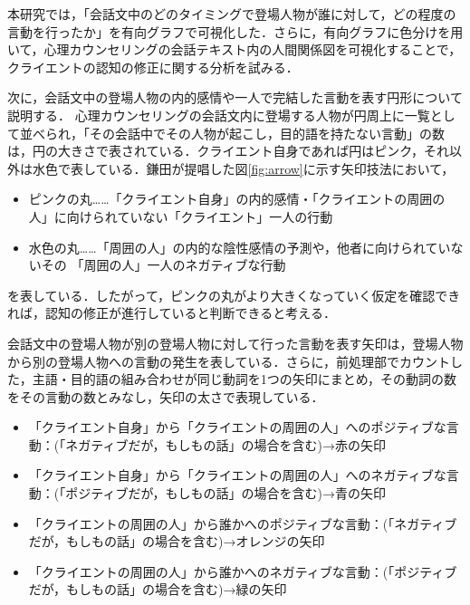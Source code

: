 \documentclass[shuuron]{kuee}
\begin{document}
本研究では，「会話文中のどのタイミングで登場人物が誰に対して，どの程度の言動を行ったか」を有向グラフで可視化した．さらに，有向グラフに色分けを用いて，心理カウンセリングの会話テキスト内の人間関係図を可視化することで，クライエントの認知の修正に関する分析を試みる．


次に，会話文中の登場人物の内的感情や一人で完結した言動を表す円形について説明する．
心理カウンセリングの会話文内に登場する人物が円周上に一覧として並べられ，「その会話中でその人物が起こし，目的語を持たない言動」の数は，円の大きさで表されている．クライエント自身であれば円はピンク，それ以外は水色で表している．鎌田\cite{鎌田穣2002臨床}が提唱した図\ref{fig:arrow}に示す矢印技法において，
\begin{itemize}
  \item ピンクの丸……「クライエント自身」の内的感情・「クライエントの周囲の人」に向けられていない「クライエント」一人の行動
  \item 水色の丸……「周囲の人」の内的な陰性感情の予測や，他者に向けられていないその
  「周囲の人」一人のネガティブな行動
\end{itemize}
を表している．したがって，ピンクの丸がより大きくなっていく仮定を確認できれば，認知の修正が進行していると判断できると考える．

会話文中の登場人物が別の登場人物に対して行った言動を表す矢印は，登場人物から別の登場人物への言動の発生を表している．さらに，前処理部でカウントした，主語・目的語の組み合わせが同じ動詞を1つの矢印にまとめ，その動詞の数をその言動の数とみなし，矢印の太さで表現している．


\begin{itemize}
  \item 「クライエント自身」から「クライエントの周囲の人」へのポジティブな言動：(「ネガティブだが，もしもの話」の場合を含む)→赤の矢印
  \item 「クライエント自身」から「クライエントの周囲の人」へのネガティブな言動：(「ポジティブだが，もしもの話」の場合を含む)→青の矢印
  \item 「クライエントの周囲の人」から誰かへのポジティブな言動：(「ネガティブだが，もしもの話」の場合を含む)→オレンジの矢印
  \item 「クライエントの周囲の人」から誰かへのネガティブな言動：(「ポジティブだが，もしもの話」の場合を含む)→緑の矢印
\end{itemize}
\end{document}
